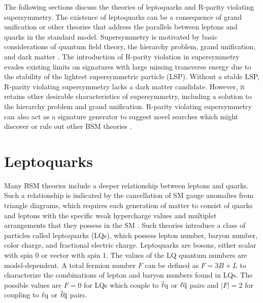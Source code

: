 The following sections discuss the theories of leptoquarks and R-parity violating supersymmetry. The existence of leptoquarks can be a consequence of grand unification or other theories that address the parallels between leptons and quarks in the standard model. Supersymmetry is motivated by basic considerations of quantum field theory, the hierarchy problem, grand unification, and dark matter \cite{SUSY1,SUSY2}. The introduction of R-parity violation in supersymmetry evades existing limits on signatures with large missing transverse energy due to the stability of the lightest supersymmetric particle (LSP). Without a stable LSP, R-parity violating supersymmetry lacks a dark matter candidate. However, it retains other desirable characteristics of supersymmetry, including a solution to the hierarchy problem and grand unification. R-parity violating supersymmetry can also act as a signature generator to suggest novel searches which might discover or rule out other BSM theories \cite{EvansSigGen}.

\section{Leptoquarks
\label{sec:LQ}}

Many BSM theories include a deeper relationship between leptons and quarks. Such a relationship is indicated by the cancellation of SM gauge anomalies from triangle diagrams, which requires each generation of matter to consist of quarks and leptons with the specific weak hypercharge values and multiplet arrangements that they possess in the SM \cite{Peskin}. Such theories introduce a class of particles called leptoquarks (LQs), which possess lepton number, baryon number, color charge, and fractional electric charge. Leptoquarks are bosons, either scalar with spin 0 or vector with spin 1. The values of the LQ quantum numbers are model-dependent. A total fermion number $F$ can be defined as $F = 3B + L$ to characterize the combinations of lepton and baryon numbers found in LQs. The possible values are $F=0$ for LQs which couple to $\overline{\ell}\mathrm{q}$ or $\ell\overline{\mathrm{q}}$ pairs and $|F|=2$ for coupling to $\ell\mathrm{q}$ or $\overline{\ell}\overline{\mathrm{q}}$ pairs.

